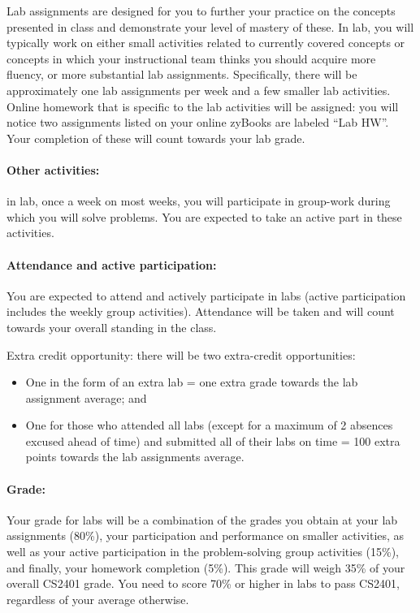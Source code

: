 \documentclass[12pt]{scrartcl}
\newcommand{\change}[2]{#2}
\begin{document}
Lab assignments are designed for you to further your practice on the concepts presented in class and demonstrate your level of mastery of these. 
In lab, you will typically work on either small activities related to currently covered concepts or concepts in which your instructional team thinks you should acquire more fluency, or more substantial lab assignments. 
Specifically, there will be \change{7 or 8 longer}{approximately one} lab assignments \change{}{per week} and a few smaller lab activities. 
Online homework that is specific to the lab activities will be assigned: you will notice two assignments listed on your online zyBooks are labeled “Lab HW”. 
Your completion of these will count towards your lab grade. 

\paragraph{Other activities:} in lab, once a week on most weeks, you will participate in group-work during which you will solve problems\change{ (offline: at the white board)}. 
You are expected to take an active part in these activities.

\paragraph{Attendance and active participation:} You are expected to attend and actively participate in labs (active participation includes the weekly group activities). 
Attendance will be taken and will count towards your overall standing in the class.

Extra credit opportunity: there will be two extra-credit opportunities: 
\begin{itemize}
\item One in the form of an extra lab = one extra grade towards the lab assignment average; and 
\item One for those who attended all labs (except for a maximum of 2 absences excused ahead of time) and submitted all of their labs on time = 100 extra points towards the lab assignments average.
\end{itemize}

\paragraph{Grade:} Your grade for labs will be a combination of the grades you obtain at your lab assignments (80\%), your participation and performance on smaller activities, as well as your active participation in the problem-solving group activities (15\%), and finally, your homework completion (5\%). 
This grade will weigh 35\% of your overall CS2401 grade. 
You need to score 70\% or higher in labs to pass CS2401, regardless of your average otherwise.
\end{document}
